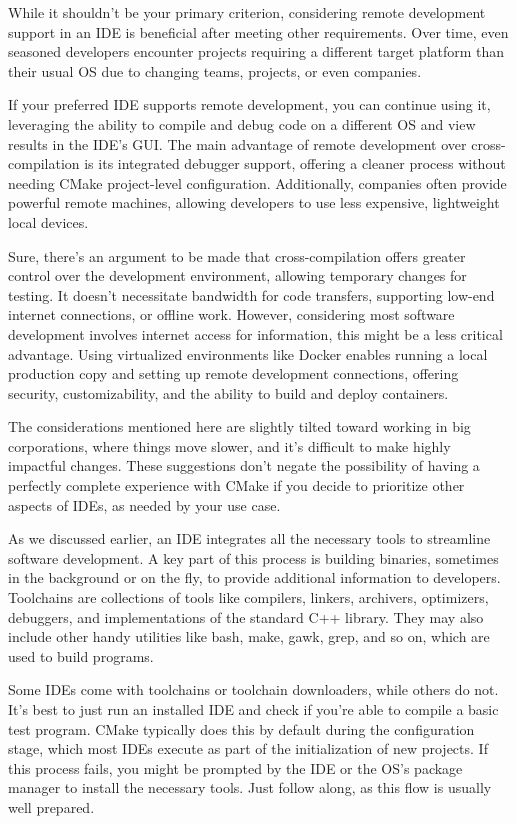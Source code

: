 While it shouldn’t be your primary criterion, considering remote development support in an IDE is beneficial after meeting other requirements. Over time, even seasoned developers encounter projects requiring a different target platform than their usual OS due to changing teams, projects, or even companies.

If your preferred IDE supports remote development, you can continue using it, leveraging the ability to compile and debug code on a different OS and view results in the IDE’s GUI. The main advantage of remote development over cross-compilation is its integrated debugger support, offering a cleaner process without needing CMake project-level configuration. Additionally, companies often provide powerful remote machines, allowing developers to use less expensive, lightweight local devices.

Sure, there’s an argument to be made that cross-compilation offers greater control over the development environment, allowing temporary changes for testing. It doesn’t necessitate bandwidth for code transfers, supporting low-end internet connections, or offline work. However, considering most software development involves internet access for information, this might be a less critical advantage. Using virtualized environments like Docker enables running a local production copy and setting up remote development connections, offering security, customizability, and the ability to build and deploy containers.

The considerations mentioned here are slightly tilted toward working in big corporations, where things move slower, and it’s difficult to make highly impactful changes. These suggestions don’t negate the possibility of having a perfectly complete experience with CMake if you decide to prioritize other aspects of IDEs, as needed by your use case.


As we discussed earlier, an IDE integrates all the necessary tools to streamline software development. A key part of this process is building binaries, sometimes in the background or on the fly, to provide additional information to developers. Toolchains are collections of tools like compilers, linkers, archivers, optimizers, debuggers, and implementations of the standard C++ library. They may also include other handy utilities like bash, make, gawk, grep, and so on, which are used to build programs.

Some IDEs come with toolchains or toolchain downloaders, while others do not. It’s best to just run an installed IDE and check if you’re able to compile a basic test program. CMake typically does this by default during the configuration stage, which most IDEs execute as part of the initialization of new projects. If this process fails, you might be prompted by the IDE or the OS’s package manager to install the necessary tools. Just follow along, as this flow is usually well prepared.

